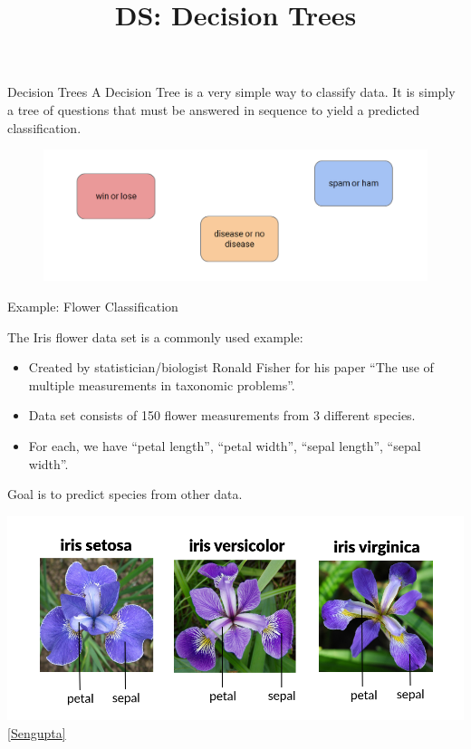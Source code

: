 \documentclass[aspectratio=169]{../latex_main/tntbeamer}  %
\title[Introduction]{DS: Decision Trees}
\subtitle{}
\begin{document}
	
	\maketitle
	\begin{frame}{Decision Trees}
	    A Decision Tree is a very simple way to classify data. It is simply a tree of questions that must be answered in sequence to yield a predicted classification.
	    \begin{figure}
	        \centering
	        \includegraphics[scale=.35]{Bild1}
	    \end{figure}
	\end{frame}
	
	
	\begin{frame}{Example: Flower Classification}
	
	\vspace{-2em}
	    The Iris flower data set is a commonly used example:
	    \begin{itemize}
	        \item Created by statistician/biologist Ronald Fisher for his paper “The use of multiple measurements in taxonomic problems”.
	        \item Data set consists of 150 flower measurements from 3 different species.
	        \item For each, we have “petal length”, “petal width”, “sepal length”, “sepal width”.
	    \end{itemize}
	    Goal is to predict species from other data.

	        \centering
	        \includegraphics[scale=.24]{iris}
        \footnotesize \href{https://medium.com/codex/iris-101-dataset-acquisition-and-understanding-73e8b271704c}{[Sengupta]}

	\end{frame}
\end{document}
